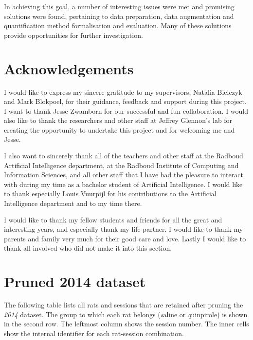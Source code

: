 \documentclass[conference,a4paper,twoside]{IEEEtran}
\begin{document}
In achieving this goal, a number of interesting issues were met and promising solutions were found, pertaining to data preparation, data augmentation and quantification method formalisation and evaluation. Many of these solutions provide opportunities for further investigation.

\section*{Acknowledgements}
I would like to express my sincere gratitude to my supervisors, Natalia Bielczyk and Mark Blokpoel, for their guidance, feedback and support during this project. I want to thank Jesse Zwamborn for our successful and fun collaboration. I would also like to thank the researchers and other staff at Jeffrey Glennon's lab for creating the opportunity to undertake this project and for welcoming me and Jesse.

I also want to sincerely thank all of the teachers and other staff at the Radboud Artificial Intelligence department, at the Radboud Institute of Computing and Information Sciences, and all other staff that I have had the pleasure to interact with during my time as a bachelor student of Artificial Intelligence. I would like to thank especially Louis Vuurpijl for his contributions to the Artificial Intelligence department and to my time there.

I would like to thank my fellow students and friends for all the great and interesting years, and especially thank my life partner. I would like to thank my parents and family very much for their good care and love. Lastly I would like to thank all involved who did not make it into this section.




\appendices

\section{Pruned 2014 dataset}
\label{apdx:2014choice}

The following table lists all rats and sessions that are retained after pruning the \emph{2014} dataset. The group to which each rat belongs (\emph{s}aline or \emph{q}uinpirole) is shown in the second row. The leftmost column shows the session number. The inner cells show the internal identifier for each rat-session combination.
\end{document}
